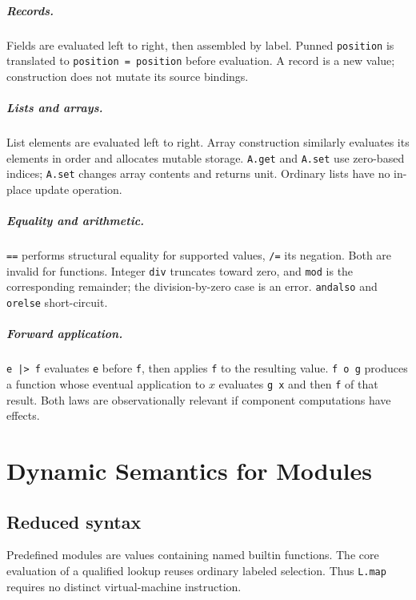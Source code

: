 \documentclass[11pt,oneside,openany]{book}
\newcommand{\kw}[1]{\texttt{#1}}
\begin{document}
\paragraph{Records.} Fields are evaluated left to right, then assembled by label. Punned \kw{position} is translated to \kw{position = position} before evaluation. A record is a new value; construction does not mutate its source bindings.

\paragraph{Lists and arrays.} List elements are evaluated left to right. Array construction similarly evaluates its elements in order and allocates mutable storage. \kw{A.get} and \kw{A.set} use zero-based indices; \kw{A.set} changes array contents and returns unit. Ordinary lists have no in-place update operation.

\paragraph{Equality and arithmetic.} \kw{==} performs structural equality for supported values, \kw{/=} its negation. Both are invalid for functions. Integer \kw{div} truncates toward zero, and \kw{mod} is the corresponding remainder; the division-by-zero case is an error. \kw{andalso} and \kw{orelse} short-circuit.

\paragraph{Forward application.} \kw{e |> f} evaluates \kw{e} before \kw{f}, then applies \kw{f} to the resulting value. \kw{f o g} produces a function whose eventual application to $x$ evaluates \kw{g x} and then \kw{f} of that result. Both laws are observationally relevant if component computations have effects.

\chapter{Dynamic Semantics for Modules}
\section{Reduced syntax}
Predefined modules are values containing named builtin functions. The core evaluation of a qualified lookup reuses ordinary labeled selection. Thus \kw{L.map} requires no distinct virtual-machine instruction.
\end{document}
